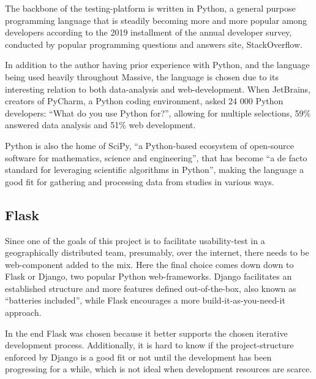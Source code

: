 {  The backbone of the testing-platform is written in  Python\cite{citePython},
  a general purpose programming language that is steadily becoming
  more and more popular among developers according to the 2019 installment of
  the annual developer survey\cite{citeStackOverflow2019Survey},
  conducted by popular programming questions and answers site,
  StackOverflow\cite{citeStackOverflow}.

  In addition to the author having prior experience with Python, and the
  language being used heavily throughout Massive, the language
  is chosen due to its interesting relation to both data-analysis and
  web-development. When
  JetBrains\cite{citeJetBrains},
  creators of
  PyCharm\cite{citePyCharm},
  a Python coding environment, asked 24 000 Python
  developers:
  ``What do you use Python for?''\cite{citeJetSurvey}, allowing for multiple
  selections, 59\% answered data analysis and 51\% web development.

  Python is also the home of SciPy, ``a Python-based ecosystem of open-source
  software for mathematics, science and engineering''\cite{citeSciPyHomepage},
  that has become ``a de facto
  standard for leveraging scientific algorithms in
  Python''\cite{citeSciPyPaper}, making the language a good fit for gathering
  and processing data from studies in various ways.

  \subsection{Flask}

  Since one of the goals of this project is to facilitate usability-test in a
  geographically distributed team, presumably, over the internet, there
  needs to be web-component added to the mix. Here the final choice comes down
  down to Flask\cite{citeFlaskHomepage} or Django\cite{citeDjangoHomepage},
  two popular Python web-frameworks. Django facilitates an established
  structure and more features defined out-of-the-box, also known as ``batteries
  included'', while Flask encourages a more build-it-as-you-need-it approach.

  In the end Flask was chosen because it better supports the chosen iterative
  development process. Additionally, it is hard to know if the
  project-structure enforced by Django is a good fit or not until the
  development has been progressing for a while, which is not ideal when
  development resources are scarce.


%
%

}
